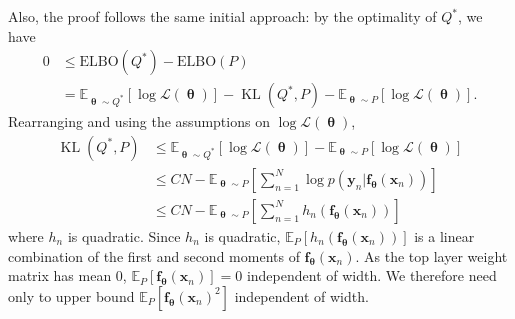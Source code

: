 \documentclass[twoside]{article}
\newcommand{\vf}{\mathbf{f}}
\newcommand{\vx}{\mathbf{x}}
\newcommand{\vy}{\mathbf{y}}
\newcommand{\vtheta}{\bm{\uptheta}}
\newcommand{\E}{\mathbb{E}}
\renewcommand{\P}{\mathbb{P}}
\newcommand{\Q}{\mathbb{Q}}
\renewcommand{\Q}{\ensuremath{Q}}
\renewcommand{\P}{\ensuremath{P}}
\newcommand{\KL}{\operatorname{KL}}
\theoremstyle{theoremstyle}
\begin{document}
Also, the proof follows the same initial approach: by the optimality of $\Q^*$, we have
\begin{align}
	0 &\leq \text{ELBO}(Q^*) -  \text{ELBO}(P) \\
	&= \mathbb{E}_{\vtheta\sim Q^*}[\log \mathcal{L}(\vtheta)]- \KL(Q^*, P) - \mathbb{E}_{\vtheta\sim P}[\log \mathcal{L}(\vtheta)].     
\end{align}
Rearranging and using the assumptions on $\log \mathcal{L}(\vtheta)$,
\begin{align}
    \!\!\!\KL(Q^*, P) &\leq \mathbb{E}_{\vtheta\sim Q^*}[\log \mathcal{L}(\vtheta)] -\mathbb{E}_{\vtheta\sim P}[\log \mathcal{L}(\vtheta)]\\
    & \leq \!CN \!-\! \mathbb{E}_{\vtheta\sim P}[\textstyle\sum_{n=1}^N \!\log p(\vy_n | \vf_{\vtheta}(\vx_n))] \\
    & \leq \! CN \!-\! \E_{\vtheta \sim \P}[\textstyle\sum_{n=1}^N h_n(\vf_{\vtheta}(\vx_n))]
\end{align} 
where $h_n$ is quadratic. Since $h_n$ is quadratic, $\E_{\P}[h_n(\vf_{\vtheta}(\vx_n))]$ is a linear combination of the first and second moments of $\vf_{\vtheta}(\vx_n)$. As the top layer weight matrix has mean $0$, $\E_{\P}[\vf_{\vtheta}(\vx_n)]=0$ independent of width. We therefore need only to upper bound $\E_{\P}[\vf_{\vtheta}(\vx_n)^2]$ independent of width.
\end{document}

